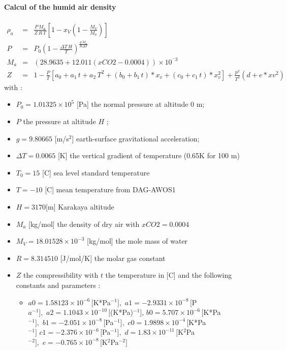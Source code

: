 \paragraph*{Calcul of the humid air density}
\begin{eqnarray}
	\rho_a &= & \frac{P\,M_a}{Z\,R\,T}\left[1-x_V\left(1-\frac{M_V}{M_a}\right)\right]\label{subsubsec:rho_a}\\
	P &= & P_0\left(1-\frac{\Delta T\,H}{T}\right)^{\frac{g\,M_a}{R\Delta T}}\nonumber\\
	M_a &= &\left(28.9635+12.011(xCO2-0.0004)\right)\times 10^{^-3}\nonumber\\
	Z &= &1-\frac{P}{T}\left[a_0+a_1\,t+a_2\,T^2+\left(b_0+b_1\,t\right)*x_v +(c_0+c_1\,t)*x_v^2\right] +\frac{p^2}{T^2}\left(d+e*xv^2\right)\nonumber
\end{eqnarray}
with :
\begin{itemize}
	\item $P_0 = 1.01325\times 10^5$ [Pa] the normal pressure at altitude 0 m;
	\item $P$ the pressure at altitude $H$ \cite{app:Wiki_HumidDensityAir};
	\item $g = 9.80665$ [m/s$^2$] earth-surface gravitational acceleration;
	\item $\Delta T = 0.0065$ [K] the vertical gradient of temperature (0.65K for 100 m)\cite{wiki_DP}
	\item $T_0 = 15$ [\degree C] sea level standard temperature
	\item $T = -10$ [\degree C] mean temperature from DAG-AWOS1
	\item $H = 3170$[m] Karakaya altitude
	\item $M_a$ [kg/mol] the density of dry air with $xCO2 = 0.0004$ \cite{Davis1992}
	\item $M_V = 18.01528\times 10^{-3}$ [kg/mol] the mole mass of water
	\item $R = 8.314510$ [J/mol/K] the molar gas constant
	\item $Z$ the compressibility with $t$ the temperature in [\degree C] and the following constants and parameters \cite{Davis1992} :\\
	\begin{itemize}
		\item $a0 = 1.58123\times 10^{-6}\,[$K*Pa$^{-1}],\,\,a1 = -2.9331\times 10^{-8}\,[$P$a^{-1}],\,\, a2 = 1.1043\times 10^{-10}\,[$(K*Pa)$^{-1}]$, $b0 = 5.707\times 10^{-6}\,[$K*Pa$^{-1}],\,\,b1 = -2.051\times 10^{-8}\,[$Pa$^{-1}],\,\,c0 = 1.9898\times 10^{-4}\,[$K*Pa$^{-1}]\,\,c1 = -2.376\times 10^{-6}\,[$Pa$^{-1}],\,\,d  = 1.83\times 10^{-11}\,[$K$^2$Pa$^{-2}],\,\,e  = -0.765\times 10^{-8}\,[$K$^2$Pa$^{-2}]$

\end{itemize}
\end{itemize}
